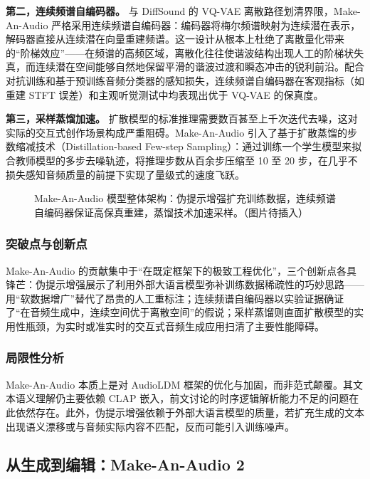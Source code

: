 \documentclass[12pt,a4paper]{article}
\begin{document}
\textbf{第二，连续频谱自编码器。} 与 DiffSound 的 VQ-VAE 离散路径划清界限，Make-An-Audio 严格采用连续频谱自编码器：编码器将梅尔频谱映射为连续潜在表示，解码器直接从连续潜在向量重建频谱。这一设计从根本上杜绝了离散量化带来的“阶梯效应”——在频谱的高频区域，离散化往往使谐波结构出现人工的阶梯状失真，而连续潜在空间能够自然地保留平滑的谐波过渡和瞬态冲击的锐利前沿。配合对抗训练和基于预训练音频分类器的感知损失，连续频谱自编码器在客观指标（如重建 STFT 误差）和主观听觉测试中均表现出优于 VQ-VAE 的保真度。

\textbf{第三，采样蒸馏加速。} 扩散模型的标准推理需要数百甚至上千次迭代去噪，这对实际的交互式创作场景构成严重阻碍。Make-An-Audio 引入了基于扩散蒸馏的步数缩减技术（Distillation-based Few-step Sampling）：通过训练一个学生模型来拟合教师模型的多步去噪轨迹，将推理步数从百余步压缩至 10 至 20 步，在几乎不损失感知音频质量的前提下实现了量级式的速度飞跃。

\begin{figure}[htbp]
\centering
{}
\caption{Make-An-Audio 模型整体架构：伪提示增强扩充训练数据，连续频谱自编码器保证高保真重建，蒸馏技术加速采样。（图片待插入）}
\label{fig:makeanaudio}
\end{figure}

\subsubsection{突破点与创新点}
Make-An-Audio 的贡献集中于“在既定框架下的极致工程优化”，三个创新点各具锋芒：伪提示增强展示了利用外部大语言模型弥补训练数据稀疏性的巧妙思路——用“软数据增广”替代了昂贵的人工重标注；连续频谱自编码器以实验证据确证了“在音频生成中，连续空间优于离散空间”的假说；采样蒸馏则直面扩散模型的实用性瓶颈，为实时或准实时的交互式音频生成应用扫清了主要性能障碍。

\subsubsection{局限性分析}
Make-An-Audio 本质上是对 AudioLDM 框架的优化与加固，而非范式颠覆。其文本语义理解仍主要依赖 CLAP 嵌入，前文讨论的时序逻辑解析能力不足的问题在此依然存在。此外，伪提示增强依赖于外部大语言模型的质量，若扩充生成的文本出现语义漂移或与音频实际内容不匹配，反而可能引入训练噪声。

\subsection{从生成到编辑：Make-An-Audio 2}
\end{document}
